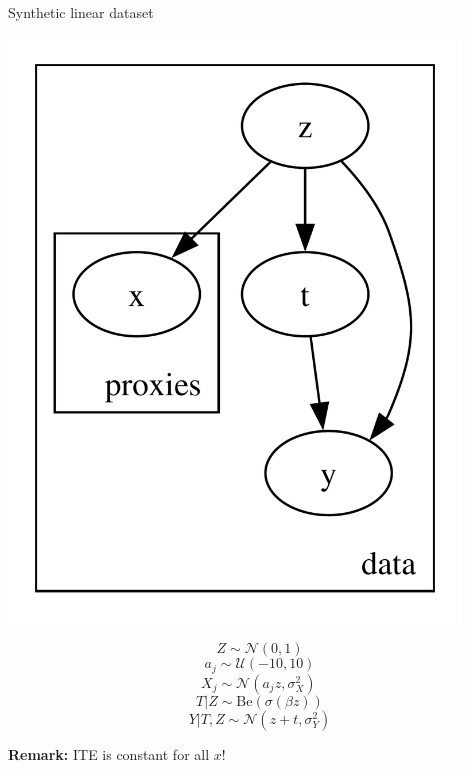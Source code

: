 \documentclass[10pt]{beamer}
\begin{document}
\begin{frame}{Synthetic linear dataset}
    \begin{minipage}{0.48\textwidth}
      \includegraphics[width=0.9\textwidth]{images/pyro_model.pdf}
    \end{minipage}
    \begin{minipage}{0.48\textwidth}
        \begin{equation*}
        Z \sim \mathcal{N}(0,1)
        \end{equation*}
        \begin{equation*}
             a_j \sim \mathcal{U}(-10,10)
        \end{equation*}
        \begin{equation*}
        X_j \sim \mathcal{N}(a_j z,\sigma_X^2)\,    
        \end{equation*}
        \begin{equation*}
        T | Z \sim \text{Be}(\sigma(\beta z))    
        \end{equation*}
        \small{\begin{equation*}
        Y|T,Z \sim \mathcal{N}(z + t, \sigma_Y^2)            
        \end{equation*}}
      \end{minipage}
      \centering
      {\textbf{Remark:} ITE is constant for all  $x$!}
\end{frame}
\end{document}
